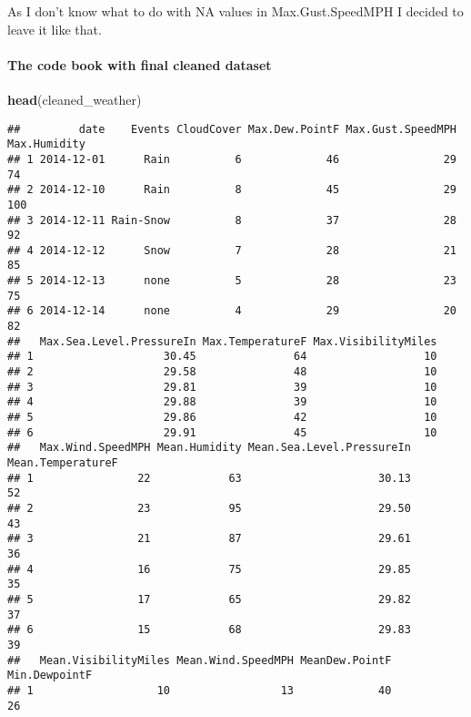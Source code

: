\documentclass[
]{article}
\newenvironment{Shaded}{\begin{snugshade}}{\end{snugshade}}
\newcommand{\KeywordTok}[1]{\textcolor[rgb]{0.13,0.29,0.53}{\textbf{#1}}}
\newcommand{\NormalTok}[1]{#1}
\begin{document}
As I don't know what to do with NA values in Max.Gust.SpeedMPH I decided
to leave it like that.

\hypertarget{the-code-book-with-final-cleaned-dataset}{%
\paragraph{The code book with final cleaned
dataset}\label{the-code-book-with-final-cleaned-dataset}}

\begin{Shaded}
\begin{Highlighting}[]
\KeywordTok{head}\NormalTok{(cleaned_weather)}
\end{Highlighting}
\end{Shaded}

\begin{verbatim}
##         date    Events CloudCover Max.Dew.PointF Max.Gust.SpeedMPH Max.Humidity
## 1 2014-12-01      Rain          6             46                29           74
## 2 2014-12-10      Rain          8             45                29          100
## 3 2014-12-11 Rain-Snow          8             37                28           92
## 4 2014-12-12      Snow          7             28                21           85
## 5 2014-12-13      none          5             28                23           75
## 6 2014-12-14      none          4             29                20           82
##   Max.Sea.Level.PressureIn Max.TemperatureF Max.VisibilityMiles
## 1                    30.45               64                  10
## 2                    29.58               48                  10
## 3                    29.81               39                  10
## 4                    29.88               39                  10
## 5                    29.86               42                  10
## 6                    29.91               45                  10
##   Max.Wind.SpeedMPH Mean.Humidity Mean.Sea.Level.PressureIn Mean.TemperatureF
## 1                22            63                     30.13                52
## 2                23            95                     29.50                43
## 3                21            87                     29.61                36
## 4                16            75                     29.85                35
## 5                17            65                     29.82                37
## 6                15            68                     29.83                39
##   Mean.VisibilityMiles Mean.Wind.SpeedMPH MeanDew.PointF Min.DewpointF
## 1                   10                 13             40            26

\end{verbatim}
\end{document}
